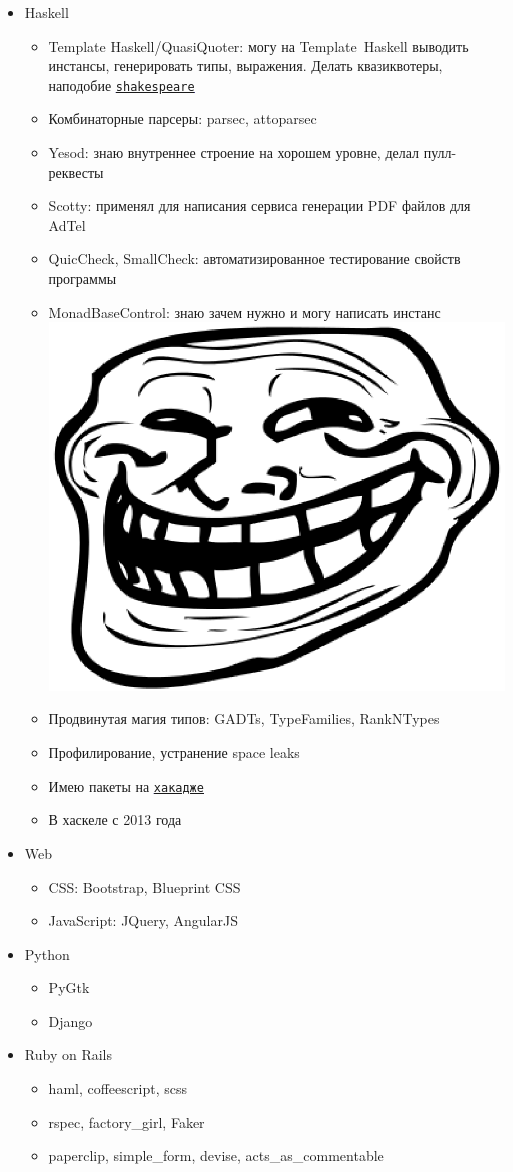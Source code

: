 \documentclass[11pt,a4paper,sans]{moderncv}        %
\newcommand*{\nlink}[2]{\textcolor{blue}{\texttt{\underline{\href{#1}{#2}}}}}
\begin{document}
\begin{itemize}
\item Haskell
  \begin{itemize}
  \item Template Haskell/QuasiQuoter: могу на \hbox{Template Haskell}
    выводить инстансы, генерировать типы, выражения. Делать
    квазиквотеры, наподобие
    \nlink{http://hackage.haskell.org/package/shakespeare}{shakespeare}
  \item Комбинаторные парсеры: parsec, attoparsec
  \item Yesod: знаю внутреннее строение на хорошем уровне, делал пулл-реквесты
  \item Scotty: применял для написания сервиса генерации PDF файлов для AdTel
  \item QuicCheck, SmallCheck: автоматизированное тестирование свойств
    программы
  \item MonadBaseControl: знаю зачем нужно и могу написать инстанс \includegraphics[height=0.9ex]{Trollface.ps}
  \item Продвинутая магия типов: GADTs, TypeFamilies, RankNTypes
  \item Профилирование, устранение space leaks
  \item Имею пакеты на \nlink{http://hackage.haskell.org/user/AlekseyUymanov}{хакадже}
  \item В хаскеле с 2013 года
  \end{itemize}
\item Web
  \begin{itemize}
  \item CSS: Bootstrap, Blueprint CSS
  \item JavaScript: JQuery, AngularJS
  \end{itemize}
\item Python
  \begin{itemize}
  \item PyGtk
  \item Django
  \end{itemize}
\item Ruby on Rails
  \begin{itemize}
  \item haml, coffeescript, scss
  \item rspec, factory\_girl, Faker
  \item paperclip, simple\_form, devise, acts\_as\_commentable
  \end{itemize}

\end{itemize}
\end{document}
